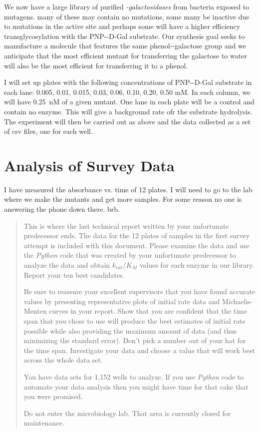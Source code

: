 \documentclass[]{tufte-handout}
\begin{document}
We now have a large library of purified \emph{\textbeta -galactosidases} from bacteria exposed to mutagens. many of these may contain no mutations, some many be inactive due to mutations in the active site and perhaps some will have a higher efficiency transglycosylation with the PNP-\textbeta-D-Gal substrate. Our synthesis goal seeks to manufacture a molecule that features the same phenol-\textbeta-galac\-tose group and we anticipate that the most efficient mutant for transferring the galactose to water will also be the most efficient for transferring it to a phenol.

I will set up plates with the following concentrations of PNP-\textbeta-D-Gal substrate in each lane: 0.005, 0.01, 0.015, 0.03, 0.06, 0.10, 0.20, 0.50 mM. In each column, we will have \qty{0.25}{nM} of a given mutant. One lane in each plate will be a control and contain no enzyme. This will give a background rate ofr the substrate hydrolysis. The experiment will then be carried out as above and the data collected as a set of csv files, one for each well.

\section{Analysis of Survey Data}

I have measured the absorbance vs. time of 12 plates. I will need to go to the lab where we make the mutants and get more samples. For some reason no one is answering the phone down there. brb.

\begin{quotation}This is where the last technical report written by your unfortunate predecessor ends. The data for the 12 plates of samples in the first survey attempt is included with this document. Please examine the data and use the \emph{Python} code that was created by your unfortunate predecessor to analyze the data and obtain $k_{cat}/K_M$ values for each enzyme in our library. Report your ten best candidates.

Be sure to reassure your excellent supervisors that you have found accurate values by presenting representative plots of initial rate data and Michaelis-Menten curves in your report. Show that you are confident that the time span that you chose to use will produce the best estimates of initial rate possible while also providing the maximum amount of data (and thus minimizing the standard error). Don't pick a number out of your hat for the time span. Investi\-gate your data and choose a value that will work best across the whole data set.

You have data sets for 1,152 wells to analyze. If you use \emph{Python} code to automate your data analysis then you might have time for that cake that you were promised.

Do not enter the microbiology lab. That area is currently closed for mainten\-ance.
\end{quotation}


\nobibliography{}
\end{document}
